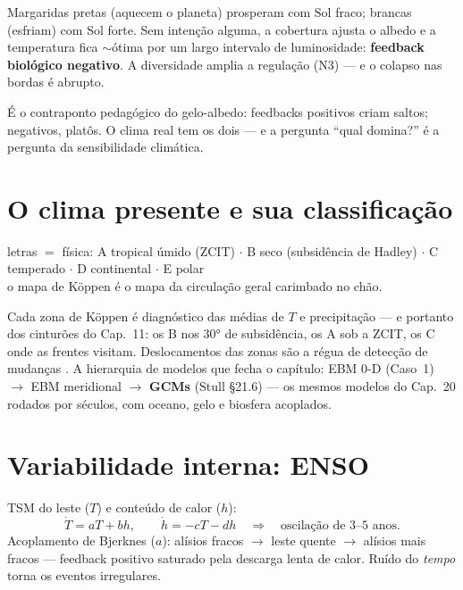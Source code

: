 \documentclass[11pt]{article}
\begin{document}
\begin{formadif}
Margaridas pretas (aquecem o planeta) prosperam com Sol fraco;
brancas (esfriam) com Sol forte. Sem intenção alguma, a cobertura
ajusta o albedo e a temperatura fica $\sim$ótima por um largo
intervalo de luminosidade: \textbf{feedback biológico negativo}.
A diversidade amplia a regulação (N3) — e o colapso nas bordas é
abrupto.
\end{formadif}

É o contraponto pedagógico do gelo-albedo: feedbacks positivos criam
saltos; negativos, platôs. O clima real tem os dois — e a pergunta
``qual domina?'' é a pergunta da sensibilidade climática.

\section{O clima presente e sua classificação}\label{sec:koppen}

\begin{noquadro}
letras $=$ física: A tropical úmido (ZCIT) $\cdot$ B seco
(subsidência de Hadley) $\cdot$ C temperado $\cdot$ D continental
$\cdot$ E polar\\[2pt]
o mapa de Köppen é o mapa da circulação geral 
carimbado no chão.
\end{noquadro}

Cada zona de Köppen é diagnóstico das médias de $T$ e precipitação —
e portanto dos cinturões do Cap.~11: os B nos $30°$ de subsidência,
os A sob a ZCIT, os C onde as frentes  visitam.
Deslocamentos das zonas são a régua de detecção de mudanças
. A hierarquia de modelos que fecha o
capítulo: EBM 0-D (Caso~1) $\to$ EBM meridional
 $\to$ \textbf{GCMs} (Stull \S21.6) — os mesmos
modelos do Cap.~20  rodados por séculos, com oceano,
gelo e biosfera acoplados.

\section{Variabilidade interna: ENSO}\label{sec:enso}


\begin{formadif}
TSM do leste ($T$) e conteúdo de calor ($h$):
\[ \dot T = aT + bh,\qquad \dot h = -cT - dh
\quad\Rightarrow\quad \text{oscilação de 3--5 anos}. \]
Acoplamento de Bjerknes ($a$): alísios fracos $\to$ leste quente
$\to$ alísios mais fracos — feedback positivo saturado pela descarga
lenta de calor. Ruído do \emph{tempo} torna os eventos irregulares.
\end{formadif}
\end{document}
